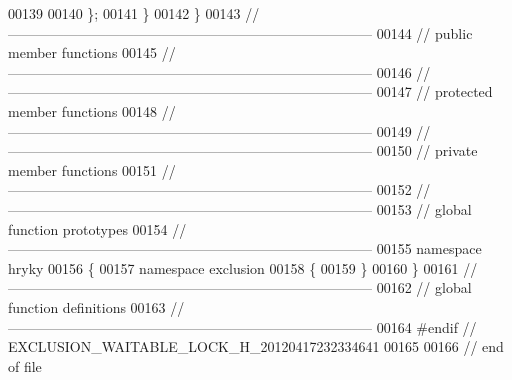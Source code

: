 \begin{DoxyCode}
00139 
00140 \};
00141 \}
00142 \}
00143 \textcolor{comment}{//
      ------------------------------------------------------------------------------}
00144 \textcolor{comment}{// public member functions}
00145 \textcolor{comment}{//
      ------------------------------------------------------------------------------}
00146 \textcolor{comment}{//
      ------------------------------------------------------------------------------}
00147 \textcolor{comment}{// protected member functions}
00148 \textcolor{comment}{//
      ------------------------------------------------------------------------------}
00149 \textcolor{comment}{//
      ------------------------------------------------------------------------------}
00150 \textcolor{comment}{// private member functions}
00151 \textcolor{comment}{//
      ------------------------------------------------------------------------------}
00152 \textcolor{comment}{//
      ------------------------------------------------------------------------------}
00153 \textcolor{comment}{// global function prototypes}
00154 \textcolor{comment}{//
      ------------------------------------------------------------------------------}
00155 \textcolor{keyword}{namespace }hryky
00156 \{
00157 \textcolor{keyword}{namespace }exclusion
00158 \{
00159 \}
00160 \}
00161 \textcolor{comment}{//
      ------------------------------------------------------------------------------}
00162 \textcolor{comment}{// global function definitions}
00163 \textcolor{comment}{//
      ------------------------------------------------------------------------------}
00164 \textcolor{preprocessor}{#endif // EXCLUSION\_WAITABLE\_LOCK\_H\_20120417232334641}
00165 \textcolor{preprocessor}{}
00166 \textcolor{comment}{// end of file}
\end{DoxyCode}

